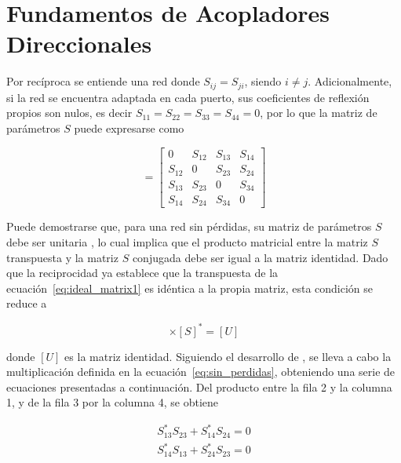 \section{Fundamentos de Acopladores Direccionales}

Por recíproca se entiende una red donde $S_{ij} = S_{ji}$, siendo $i \neq j$. Adicionalmente, si la red se encuentra adaptada en cada puerto, sus coeficientes de reflexión propios son nulos, es decir $S_{11} = S_{22} = S_{33} = S_{44} = 0$, por lo que la matriz de parámetros $S$ puede expresarse como

\begin{equation}
    [S] = 
    \begin{bmatrix} 
        0      & S_{12}   & S_{13}   & S_{14} \\ 
        S_{12} & 0        & S_{23}   & S_{24} \\ 
        S_{13} & S_{23}   & 0        & S_{34} \\ 
        S_{14} & S_{24}   & S_{34}   & 0 
    \end{bmatrix}
\label{eq:ideal_matrix1}
\end{equation}

Puede demostrarse que, para una red sin pérdidas, su matriz de parámetros $S$ debe ser unitaria \cite[p.~145]{pozar2011}, lo cual implica que el producto matricial entre la matriz $S$ transpuesta y la matriz $S$ conjugada debe ser igual a la matriz identidad. Dado que la reciprocidad ya establece que la transpuesta de la ecuación~\eqref{eq:ideal_matrix1} es idéntica a la propia matriz, esta condición se reduce a

\vspace{-0.5cm}
\begin{equation}
    [S]\times[S]^* = [U] 
\label{eq:sin_perdidas}
\end{equation}

donde $[U]$ es la matriz identidad. Siguiendo el desarrollo de \cite[Cap.~7]{pozar2011}, se lleva a cabo la multiplicación definida en la ecuación~\eqref{eq:sin_perdidas}, obteniendo una serie de ecuaciones presentadas a continuación. Del producto entre la fila 2 y la columna 1, y de la fila 3 por la columna 4, se obtiene

\vspace{-1cm}
\begin{subequations}
    \begin{align}
        S_{13}^*S_{23} + S_{14}^*S_{24} = 0 \\
        S_{14}^*S_{13} + S_{24}^*S_{23} = 0
    \end{align}
    \label{eq:eqs_f2c1}
\end{subequations}
\vspace{-0.5cm}

